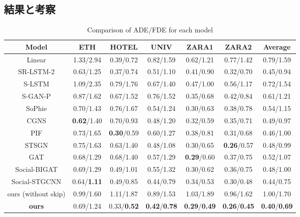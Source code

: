\subsection{結果と考察}
\begin{table}[hbtp]
  \centering
  \caption{Comparison of ADE/FDE for each model\protect\footnotemark[6]}
  \label{tab:val-results}
  \footnotesize
  \begin{tabular}{c||c|c|c|c|c|c}
  Model & ETH & HOTEL & UNIV & ZARA1 & ZARA2 & Average \\
  \hline \hline
  Linear \cite{s-lstm} & 1.33/2.94 & 0.39/0.72 & 0.82/1.59 & 0.62/1.21 & 0.77/1.42 & 0.79/1.59 \\
  \hline
  SR-LSTM-2 \cite{sr-lstm} & 0.63/1.25 & 0.37/0.74 & 0.51/1.10 & 0.41/0.90 & 0.32/0.70 & 0.45/0.94 \\
  \hline
  S-LSTM \cite{s-lstm} & 1.09/2.35 & 0.79/1.76 & 0.67/1.40 & 0.47/1.00 & 0.56/1.17 & 0.72/1.54 \\
  \hline
  S-GAN-P \cite{gupta2018social-s-gan-p} & 0.87/1.62 & 0.67/1.52 & 0.76/1.52 & 0.35/0.68 & 0.42/0.84 & 0.61/1.21 \\
  \hline
  SoPhie \cite{sadeghian2019sophie} & 0.70/1.43 & 0.76/1.67 & 0.54/1.24 & 0.30/0.63 & 0.38/0.78 & 0.54/1.15 \\
  \hline
  CGNS \cite{li2019conditional-cgns} & \textbf{0.62}/1.40 & 0.70/0.93 & 0.48/1.20 & 0.32/0.59 & 0.35/0.71 & 0.49/0.97 \\
  \hline
  PIF \cite{liang2019peeking-pif} & 0.73/1.65 & \textbf{0.30}/0.59 & 0.60/1.27 & 0.38/0.81 & 0.31/0.68 & 0.46/1.00 \\
  \hline
  STSGN \cite{zhang2019stochastic-stsgn} & 0.75/1.63 & 0.63/1.40 & 0.48/1.08 & 0.30/0.65 & \textbf{0.26}/0.57 & 0.48/0.99 \\
  \hline
  GAT \cite{s-bigat} & 0.68/1.29 & 0.68/1.40 & 0.57/1.29 & \textbf{0.29}/0.60 & 0.37/0.75 & 0.52/1.07 \\
  \hline
  Social-BIGAT \cite{s-bigat} & 0.69/1.29 & 0.49/1.01 & 0.55/1.32 & 0.30/0.62 & 0.36/0.75 & 0.48/1.00 \\
  \hline
  Social-STGCNN\cite{s-stgcnn} & 0.64/\textbf{1.11} & 0.49/0.85 & 0.44/0.79 & 0.34/0.53 & 0.30/0.48 & 0.44/0.75 \\
  \hline \hline
  ours (without skip) & 0.99/1.60 & 1.11/1.87 & 0.89/1.53 & 1.03/1.89 & 0.96/1.62 & 1.00/1.70\\
  \hline
  \textbf{ours} & 0.69/1.24 & 0.33/\textbf{0.52} & \textbf{0.42}/\textbf{0.78} & \textbf{0.29}/\textbf{0.49} & \textbf{0.26}/\textbf{0.45} & \textbf{0.40}/\textbf{0.69} \\
  \hline
  \end{tabular}
\end{table}

